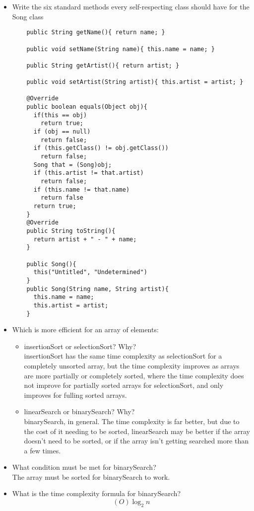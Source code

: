 \documentclass{article}
\begin{document}
\begin{itemize}
  \item Write the six standard methods every self-respecting class should have for the Song class
  \begin{lstlisting}
    public String getName(){ return name; }
    
    public void setName(String name){ this.name = name; }
    
    public String getArtist(){ return artist; }
    
    public void setArtist(String artist){ this.artist = artist; }
    
    @Override
    public boolean equals(Object obj){
      if(this == obj)
        return true;
      if (obj == null)
        return false;
      if (this.getClass() != obj.getClass())
        return false;
      Song that = (Song)obj;
      if (this.artist != that.artist)
        return false;
      if (this.name != that.name)
        return false
      return true;
    }
    @Override
    public String toString(){
      return artist + " - " + name;
    }
    
    public Song(){
      this("Untitled", "Undetermined")
    }
    public Song(String name, String artist){
      this.name = name;
      this.artist = artist;
    }
  \end{lstlisting}
  \item Which is more efficient for an array of elements:
  \begin{itemize}
    \item insertionSort or selectionSort? Why?\\
    insertionSort has the same time complexity as selectionSort for a completely unsorted array, but the time complexity improves as arrays are more partially or completely sorted, where the time complexity does not improve for partially sorted arrays for selectionSort, and only improves for fulling sorted arrays.
    \item linearSearch or binarySearch? Why?\\
    binarySearch, in general. The time complexity is far better, but due to the cost of it needing to be sorted, linearSearch may be better if the array doesn't need to be sorted, or if the array isn't getting searched more than a few times.
  \end{itemize}
  \item What condition must be met for binarySearch?\\
  The array must be sorted for binarySearch to work.
  \item What is the time complexity formula for binarySearch?\\
  \[(O)\log_2 n\]
\end{itemize}
\end{document}
